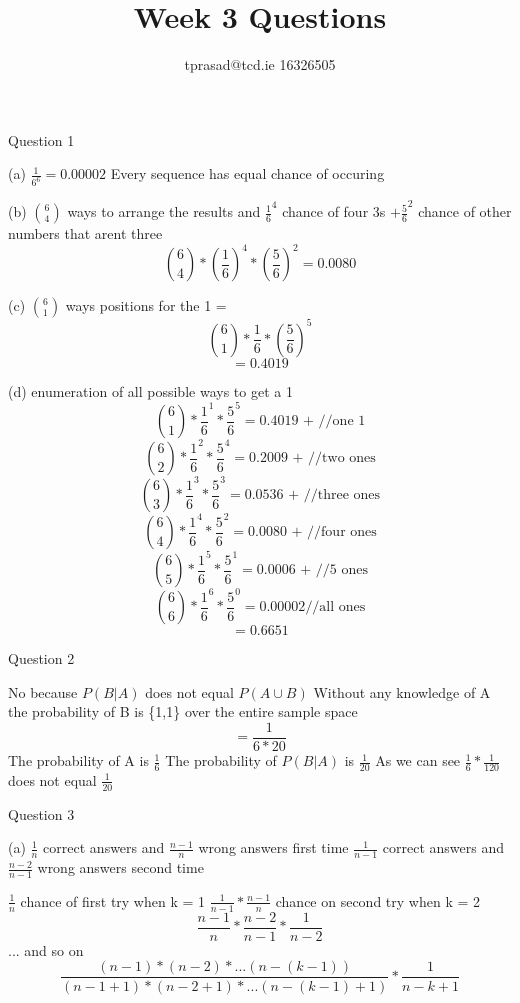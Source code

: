 \documentclass[12pt]{article}
\title{Week 3 Questions}
\author{tprasad@tcd.ie 16326505}
\begin{document}
\maketitle
\begin{flushleft}
Question 1

	(a)	$\frac{1}{6^6} = 0.00002$ Every sequence has equal chance of occuring
	
	(b) $\binom{6}{4}$ ways to arrange the results and $\frac{1}{6}^4 $ chance of four 3s $+ \frac{5}{6}^2 $ chance of other numbers that arent three
		\[ \binom{6}{4}*\left(\frac{1}{6}\right)^4*\left(\frac{5}{6}\right) ^2= 0.0080 \]
		
	(c) $\binom{6}{1}$ ways positions for the 1 = 
	\[\binom{6}{1}*\frac{1}{6}*\left(\frac{5}{6}\right)^5 \]
		\[= 0.4019\]	
		
	(d) enumeration of all possible ways to get a 1
		\[ \binom{6}{1}*\frac{1}{6}^1*\frac{5}{6}^5 = 0.4019 \text{ + //one 1} \]
		\[\binom{6}{2}*\frac{1}{6}^2*\frac{5}{6}^4 = 0.2009 \text{ +  //two ones} \]
		\[\binom{6}{3}*\frac{1}{6}^3*\frac{5}{6}^3 = 0.0536 \text{ +  //three ones} \]
		\[\binom{6}{4}*\frac{1}{6}^4*\frac{5}{6}^2 = 0.0080 \text{ + //four ones} \]
		\[\binom{6}{5}*\frac{1}{6}^5*\frac{5}{6}^1 = 0.0006 \text{ + //5 ones} \]
		\[\binom{6}{6}*\frac{1}{6}^6*\frac{5}{6}^0 = 0.00002    \text{//all ones} \]
		\[ = 0.6651 \]
		
Question 2

	No because $P(B \vert A)$ does not equal $P(A \cup B)$ \newline
	Without any knowledge of  A the probability of B is \{1,1\} over the entire sample space 
	\[ = \frac{1}{6*20} \]
	The probability of A is $\frac{1}{6}$ \newline
	The probability of $P(B \vert A)$ is $\frac{1}{20}$ \newline
	As we can see $\frac{1}{6}*\frac{1}{120}$ does not equal $\frac{1}{20}$
	
Question 3

	(a)
	$\frac{1}{n}$ correct answers and $\frac{n-1}{n}$ wrong answers first time \newline
	$\frac{1}{n-1}$ correct answers and $\frac{n-2}{n-1}$ wrong answers second time
	
	$\frac{1}{n}$ chance of first try when k = 1 \newline
	$\frac{1}{n-1}*\frac{n-1}{n}$ chance on second try when k = 2 \newline
	\[\frac{n-1}{n}*\frac{n-2}{n-1}*\frac{1}{n-2}\]
	...  and so on \newline
	\[\frac{(n-1)*(n-2)*...(n-(k-1))}{(n-1+1)*(n-2+1)*...(n-(k-1)+1)}*\frac{1}{n-k+1}\]
	

\end{flushleft}
\end{document}
